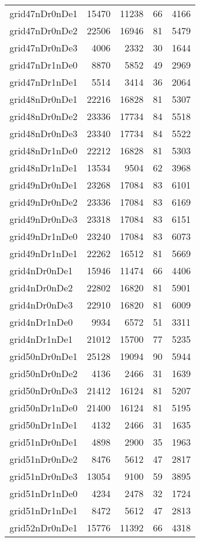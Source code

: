 \begin{tabular}{lrrrr}
grid47nDr0nDe1 & 15470 & 11238 & 66 & 4166 \\
grid47nDr0nDe2 & 22506 & 16946 & 81 & 5479 \\
grid47nDr0nDe3 & 4006 & 2332 & 30 & 1644 \\
grid47nDr1nDe0 & 8870 & 5852 & 49 & 2969 \\
grid47nDr1nDe1 & 5514 & 3414 & 36 & 2064 \\
grid48nDr0nDe1 & 22216 & 16828 & 81 & 5307 \\
grid48nDr0nDe2 & 23336 & 17734 & 84 & 5518 \\
grid48nDr0nDe3 & 23340 & 17734 & 84 & 5522 \\
grid48nDr1nDe0 & 22212 & 16828 & 81 & 5303 \\
grid48nDr1nDe1 & 13534 & 9504 & 62 & 3968 \\
grid49nDr0nDe1 & 23268 & 17084 & 83 & 6101 \\
grid49nDr0nDe2 & 23336 & 17084 & 83 & 6169 \\
grid49nDr0nDe3 & 23318 & 17084 & 83 & 6151 \\
grid49nDr1nDe0 & 23240 & 17084 & 83 & 6073 \\
grid49nDr1nDe1 & 22262 & 16512 & 81 & 5669 \\
grid4nDr0nDe1 & 15946 & 11474 & 66 & 4406 \\
grid4nDr0nDe2 & 22802 & 16820 & 81 & 5901 \\
grid4nDr0nDe3 & 22910 & 16820 & 81 & 6009 \\
grid4nDr1nDe0 & 9934 & 6572 & 51 & 3311 \\
grid4nDr1nDe1 & 21012 & 15700 & 77 & 5235 \\
grid50nDr0nDe1 & 25128 & 19094 & 90 & 5944 \\
grid50nDr0nDe2 & 4136 & 2466 & 31 & 1639 \\
grid50nDr0nDe3 & 21412 & 16124 & 81 & 5207 \\
grid50nDr1nDe0 & 21400 & 16124 & 81 & 5195 \\
grid50nDr1nDe1 & 4132 & 2466 & 31 & 1635 \\
grid51nDr0nDe1 & 4898 & 2900 & 35 & 1963 \\
grid51nDr0nDe2 & 8476 & 5612 & 47 & 2817 \\
grid51nDr0nDe3 & 13054 & 9100 & 59 & 3895 \\
grid51nDr1nDe0 & 4234 & 2478 & 32 & 1724 \\
grid51nDr1nDe1 & 8472 & 5612 & 47 & 2813 \\
grid52nDr0nDe1 & 15776 & 11392 & 66 & 4318 \\

\end{tabular}
